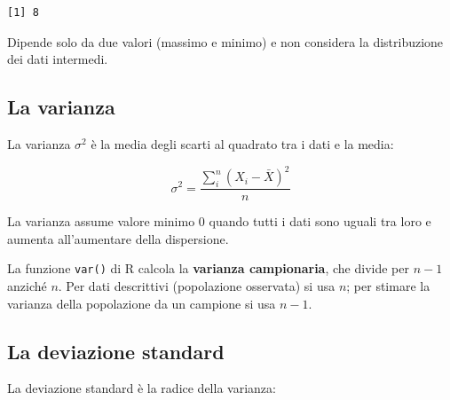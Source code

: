 \documentclass[
  a4paper,
  DIV=11,
  numbers=noendperiod]{scrreprt}
\begin{document}
\begin{verbatim}
[1] 8
\end{verbatim}

\begin{tcolorbox}[enhanced jigsaw, toprule=.15mm, left=2mm, leftrule=.75mm, breakable, coltitle=black, title={Limitazione}, bottomtitle=1mm, opacitybacktitle=0.6, toptitle=1mm, titlerule=0mm, bottomrule=.15mm, colframe=quarto-callout-caution-color-frame, arc=.35mm, rightrule=.15mm, opacityback=0, colbacktitle=quarto-callout-caution-color!10!white, colback=white]

Dipende solo da due valori (massimo e minimo) e non considera la
distribuzione dei dati intermedi.

\end{tcolorbox}

\subsection{La varianza}\label{la-varianza}

La varianza \(\sigma^2\) è la media degli scarti al quadrato tra i dati
e la media:

\[\sigma^2 = \frac{\sum_i^n (X_i - \bar{X})^2}{n}\]

La varianza assume valore minimo \(0\) quando tutti i dati sono uguali
tra loro e aumenta all'aumentare della dispersione.

\begin{tcolorbox}[enhanced jigsaw, toprule=.15mm, left=2mm, leftrule=.75mm, breakable, coltitle=black, title={Important}, bottomtitle=1mm, opacitybacktitle=0.6, toptitle=1mm, titlerule=0mm, bottomrule=.15mm, colframe=quarto-callout-important-color-frame, arc=.35mm, rightrule=.15mm, opacityback=0, colbacktitle=quarto-callout-important-color!10!white, colback=white]

La funzione \texttt{var()} di R calcola la \textbf{varianza
campionaria}, che divide per \(n-1\) anziché \(n\). Per dati descrittivi
(popolazione osservata) si usa \(n\); per stimare la varianza della
popolazione da un campione si usa \(n-1\).

\end{tcolorbox}

\subsection{La deviazione standard}\label{la-deviazione-standard}

La deviazione standard è la radice della varianza:
\end{document}
